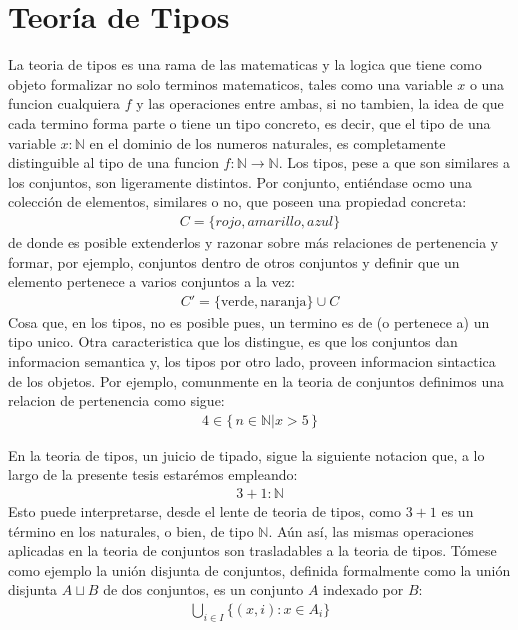 \documentclass[a4paper,12pt]{report}
\theoremstyle{definition}
\theoremstyle{plain}
\theoremstyle{remark}
\begin{document}
\section{Teoría de Tipos}
La teoria de tipos es una rama de las matematicas y la logica que tiene como objeto formalizar no solo terminos matematicos, tales como una variable $x$ o una funcion cualquiera $f$ y las operaciones entre ambas, si no tambien, la idea de que cada termino forma parte o tiene un tipo concreto, es decir, que el tipo de una variable $x : \mathbb{N}$ en el dominio de los numeros naturales, es completamente distinguible al tipo de una funcion $f : \mathbb{N} \to \mathbb{N}$.
\newline
\newline
\indent Los tipos, pese a que son similares a los conjuntos, son ligeramente distintos. Por conjunto, entiéndase ocmo una colección de elementos, similares o no, que poseen una propiedad concreta:
\begin{align}
  C = \{rojo, amarillo, azul\}
\end{align}
de donde es posible extenderlos y razonar sobre más relaciones de pertenencia y formar, por ejemplo, conjuntos dentro de otros conjuntos y definir que un elemento pertenece a varios conjuntos a la vez:
\begin{align}
  C' = \{\text{verde}, \text{naranja}\} \cup C
\end{align}
Cosa que, en los tipos, no es posible pues, un termino es de (o pertenece a) un tipo unico. Otra caracteristica que los distingue, es que los conjuntos dan informacion semantica y, los tipos por otro lado, proveen informacion sintactica de los objetos. Por ejemplo, comunmente en la teoria de conjuntos definimos una relacion de pertenencia como sigue:
\begin{align}
  4 \in \{\,n \in \mathbb{N} | x > 5 \,\}
\end{align}

En la teoria de tipos, un juicio de tipado, sigue la siguiente notacion que, a lo largo de la presente tesis estarémos empleando:
\begin{align}
  3 + 1 : \mathbb{N}
\end{align}
Esto puede interpretarse, desde el lente de teoria de tipos, como $3 + 1$ es un término en los naturales, o bien, de tipo $\mathbb{N}$. Aún así, las mismas operaciones aplicadas en la teoria de conjuntos son trasladables a la teoria de tipos. Tómese como ejemplo la unión disjunta de conjuntos, definida formalmente como la unión disjunta $A \sqcup B$ de dos conjuntos, es un conjunto $A$ indexado por $B$: 
\begin{align}
\bigcup_{i \in I} \{ (x, i) : x \in A_i \}
\end{align}
\end{document}
